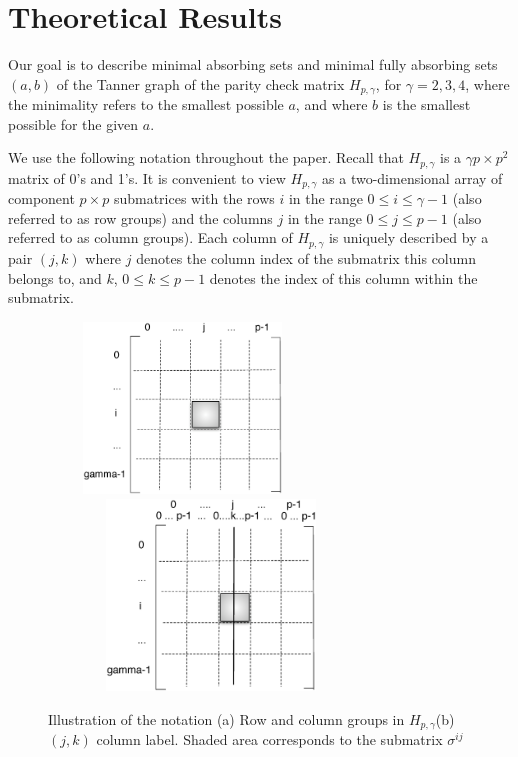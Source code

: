 \section{Theoretical Results}\label{theo1}

Our goal is to describe minimal absorbing sets and minimal fully
absorbing sets $(a,b)$ of the Tanner graph of the parity check
matrix $H_{p,\gamma}$, for $\gamma =2,3,4$, where the minimality
refers to the smallest possible $a$, and where $b$ is the smallest
possible for the given $a$.

We use the following notation throughout the paper. Recall that
$H_{p,\gamma}$ is a $\gamma p \times p^2$ matrix of 0's and 1's. It
is convenient to view $H_{p,\gamma}$ as a two-dimensional array of
component $p \times p$ submatrices with the rows $i$ in the range $0
\leq i \leq \gamma-1$ (also referred to as row groups) and the
columns $j$ in the range $0 \leq j \leq p-1$ (also referred to as
column groups). Each column of $H_{p,\gamma}$ is uniquely described
by a pair $(j,k)$ where $j$ denotes the column index of the
submatrix this column belongs to, and $k$, $0 \leq k \leq p-1$
denotes the index of this column within the submatrix.

\begin{figure}
\center\includegraphics[width=2.8in,height=1.8in]{matrix1.eps}
\\
\hspace{0.65in}\includegraphics[width=3.4in,height=2.0in]{matrix2.eps}
\caption{Illustration of the notation (a) Row and column groups in
$H_{p,\gamma}$(b) $(j,k)$ column label. Shaded area corresponds to
the submatrix $\sigma^{ij}$} \label{fig62}
\end{figure}

